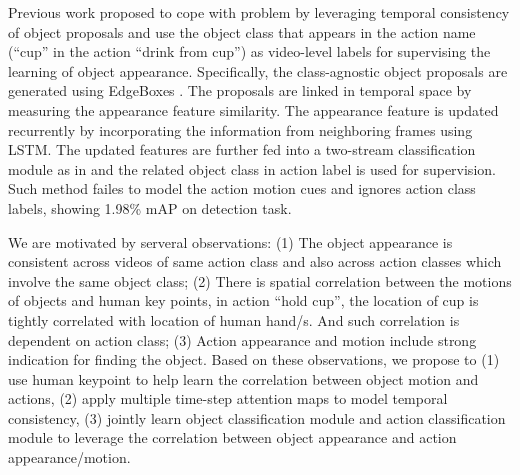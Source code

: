 Previous work \cite{yuan2017temporal} proposed to cope with problem by leveraging temporal consistency of object proposals and use the object class that appears in the action name (\eg ``cup'' in the action ``drink from cup'') as video-level labels for supervising the learning of object appearance. Specifically, the class-agnostic object proposals are generated using EdgeBoxes \cite{zitnick2014edge}. The proposals are linked in temporal space by measuring the appearance feature similarity. The appearance feature is updated recurrently by incorporating the information from neighboring frames using LSTM. The updated features are further fed into a two-stream classification module as in \cite{bilen2016weakly} and the related object class in action label is used for supervision. Such method failes to model the action motion cues and ignores action class labels, showing 1.98\% mAP on detection task.  

We are motivated by serveral observations: (1) The object appearance is consistent across videos of same action class and also across action classes which involve the same object class; (2) There is spatial correlation between the motions of objects and human key points, \eg in action ``hold cup'', the location of cup is tightly correlated with location of human hand/s. And such correlation is dependent on action class; (3) Action appearance and motion include strong indication for finding the object. Based on these observations, we propose to (1) use human keypoint to help learn the correlation between object motion and actions, (2) apply multiple time-step attention maps to model temporal consistency, (3) jointly learn object classification module and action classification module to leverage the correlation between object appearance and action appearance/motion.


